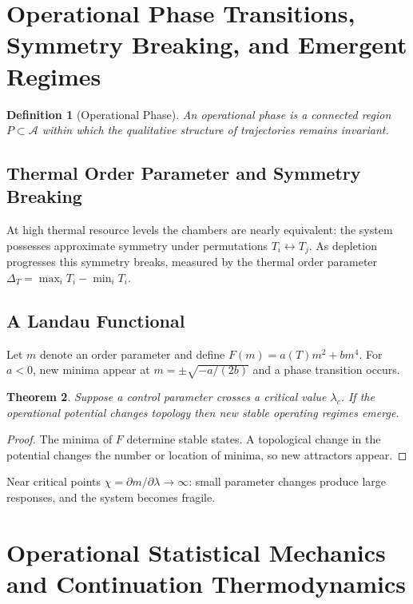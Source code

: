 \documentclass[12pt,a4paper]{article}
\newtheorem{theorem}{Theorem}[section]
\newtheorem{definition}[theorem]{Definition}
\newcommand{\A}{\mathcal{A}}
\begin{document}
\section{Operational Phase Transitions, Symmetry Breaking, and Emergent Regimes}

\begin{definition}[Operational Phase]
An \emph{operational phase} is a connected region $P \subset \A$ within which the qualitative structure of trajectories remains invariant.
\end{definition}

\subsection{Thermal Order Parameter and Symmetry Breaking}

At high thermal resource levels the chambers are nearly equivalent: the system possesses approximate symmetry under permutations $T_i \leftrightarrow T_j$. As depletion progresses this symmetry breaks, measured by the thermal order parameter $\Delta_T = \max_i T_i - \min_i T_i$.

\subsection{A Landau Functional}

Let $m$ denote an order parameter and define $F(m) = a(T)m^2 + bm^4$. For $a < 0$, new minima appear at $m = \pm\sqrt{-a/(2b)}$ and a phase transition occurs.

\begin{theorem}
Suppose a control parameter crosses a critical value $\lambda_c$. If the operational potential changes topology then new stable operating regimes emerge.
\end{theorem}

\begin{proof}
The minima of $F$ determine stable states. A topological change in the potential changes the number or location of minima, so new attractors appear.
\end{proof}

Near critical points $\chi = \partial m/\partial\lambda \to \infty$: small parameter changes produce large responses, and the system becomes fragile.

\section{Operational Statistical Mechanics and Continuation Thermodynamics}
\end{document}
